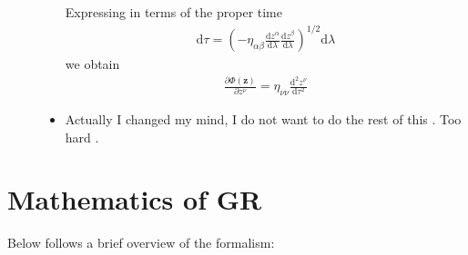 \documentclass[12pt]{report}
\newcommand{\rd}[2]{\frac{\mathrm{d}#1}{\mathrm{d}#2}}
\newcommand{\pd}[2]{\frac{\partial#1}{\partial#2}}
\newcommand{\rtd}[2]{\frac{\mathrm{d}^2#1}{\mathrm{d}#2^2}}
\newcommand{\bm}[1]{\boldsymbol{\mathbf{#1}}}
\begin{document}
\begin{description}
\begin{itemize}
                Expressing in terms of the proper time
                \begin{align*}
                    \mathrm{d}\tau =
                    \left( -\eta_{\alpha\beta}
                    \rd{z^\alpha}{\lambda}
                    \rd{z^\beta}{\lambda}\right)^{1/2} \mathrm{d}\lambda
                \end{align*}
                we obtain
                \begin{align*}
                    \pd{\Phi(\bm{z})}{z^\nu} = \eta_{\nu\nu}\rtd{z^\nu}{\tau}
                \end{align*}

            \item Actually I changed my mind, I do not want to do the rest of
                this \smiley. Too hard \frownie.
        \end{itemize}
\end{description}

\section{Mathematics of GR}

Below follows a brief overview of the formalism:
\end{document}
